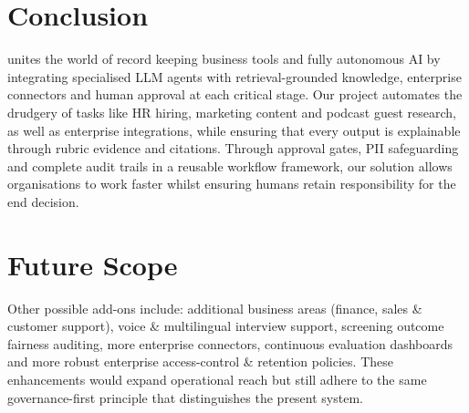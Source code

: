 
\section*{Conclusion}
\ProjectTitle{} unites the world of record keeping business tools and fully autonomous AI by integrating specialised LLM agents with retrieval-grounded knowledge, enterprise connectors and human approval at each critical stage. Our project automates the drudgery of tasks like HR hiring, marketing content and podcast guest research, as well as enterprise integrations, while ensuring that every output is explainable through rubric evidence and citations. Through approval gates, PII safeguarding and complete audit trails in a reusable workflow framework, our solution allows organisations to work faster whilst ensuring humans retain responsibility for the end decision.
\vspace{2\baselineskip}
\section*{Future Scope}
Other possible add-ons include: additional business areas (finance, sales \& customer support), voice \& multilingual interview support, screening outcome fairness auditing, more enterprise connectors, continuous evaluation dashboards and more robust enterprise access-control \& retention policies. These enhancements would expand operational reach but still adhere to the same governance-first principle that distinguishes the present system.
